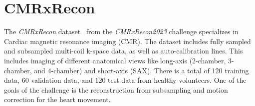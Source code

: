 \documentclass[english,version-2022-01]{uzl-thesis} %
\begin{document}
\section{CMRxRecon} \label{Sec:CMRxRecon}
The \emph{CMRxRecon} dataset~\cite{CMRxRecon} from the \emph{CMRxRecon2023} challenge specializes in Cardiac magnetic resonance imaging (CMR). The dataset includes 
fully sampled and subsampled multi-coil k-space data, as well as auto-calibration lines. This includes imaging of different anatomical views like long-axis (2-chamber, 3-chamber, and 4-chamber) and short-axis (SAX). There is a total of 120 training data, 60 validation data, and 120 test data from healthy volunteers. One of the goals of the challenge is the reconstruction from subsampling and motion correction for the heart movement.
\end{document}
